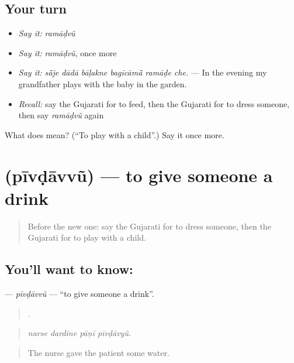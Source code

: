 \subsection*{Your turn}
\begin{itemize}
\raggedright
  \item \emph{Say it:} \emph{ramāḍvũ}
  \item \emph{Say it:} \emph{ramāḍvũ}, once more
  \item \emph{Say it:} \emph{sā̃je dādā bāḷakne bagīcāmā̃ ramāḍe che.} — In the evening my grandfather plays with the baby in the garden.
  \item \emph{Recall:} say the Gujarati for to feed, then the Gujarati for to dress someone, then say \emph{ramāḍvũ} again
\end{itemize}

\begin{tcolorbox}[breakable,colback=teal!4,colframe=teal!35!black,title={Before you move on}]
What does  mean? (\textquotedblleft{}To play with a child\textquotedblright{}.) Say it once more.
\end{tcolorbox}
\section[\texorpdfstring{\gu{પીવડાવવું} (pīvḍāvvũ)}{પીવડાવવું (pīvḍāvvũ)}]{ (pīvḍāvvũ) — to give someone a drink}

\label{lesson:GU-C488-pivdavvu}



\begin{quote}
Before the new one: say the Gujarati for to dress someone, then the Gujarati for to play with a child.
\end{quote}

\subsection*{You'll want to know: }
\textbf{} — \emph{pīvḍāvvũ} — \textquotedblleft{}to give someone a drink\textquotedblright{}.

\begin{quote}
   .
\end{quote}

\begin{quote}
\emph{narse dardīne pāṇī pīvḍāvyũ.}
\end{quote}

\begin{quote}
The nurse gave the patient some water.
\end{quote}

